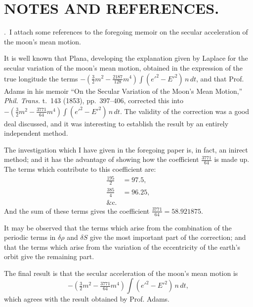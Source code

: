 \documentclass[11pt,a4paper]{article}
\newcommand{\mypar}{\par\medskip\noindent}
\begin{document}
\clearpage


\section*{NOTES AND REFERENCES.}

\medskip

\mypar
173.~I attach some references to the foregoing memoir on the secular
acceleration of the moon's mean motion.

\mypar
It is well known that Plana, developing the explanation given by Laplace for
the secular variation of the moon's mean motion, obtained in the expression of
the true longitude the terms $-\left(\frac{3}{2}m^2 - \frac{2187}{128}m^4\right)\int(e'^2 - E'^2)\,n\,dt$,
and that Prof. Adams in his memoir ``On the Secular Variation of the Moon's Mean
Motion,'' \textit{Phil. Trans.} t.~143 (1853), pp.~397--406, corrected this into
$-\left(\frac{3}{2}m^2 - \frac{3771}{64}m^4\right)\int(e'^2 - E'^2)\,n\,dt$.
The validity of the correction was a good deal discussed, and it was interesting
to establish the result by an entirely independent method.

\mypar
The investigation which I have given in the foregoing paper is, in fact, an
inirect method; and it has the advantage of showing how the coefficient
$\frac{3771}{64}$ is made up. The terms which contribute to this coefficient are:
\begin{align*}
\tfrac{195}{2} &= 97.5,\\
\tfrac{385}{4} &= 96.25,\\
\&\mathrm{c}.
\end{align*}
And the sum of these terms gives the coefficient $\frac{3771}{64} = 58.921875$.

\mypar
It may be observed that the terms which arise from the combination of the
periodic terms in $\delta\rho$ and $\delta S$ give the most important part of the
correction; and that the terms which arise from the variation of the
eccentricity of the earth's orbit give the remaining part.

\mypar
The final result is that the secular acceleration of the moon's mean motion is
\[
-\left(\tfrac{3}{2}m^2 - \tfrac{3771}{64}m^4\right)\int(e'^2 - E'^2)\,n\,dt,
\]
which agrees with the result obtained by Prof. Adams.
\end{document}
